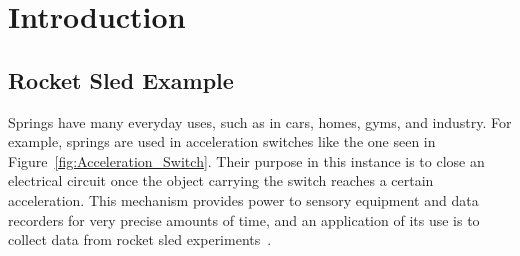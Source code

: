 \documentclass[10pt]{article}
\begin{document}
\section{Introduction}
\label{sec:Introduction}

\subsection{Rocket Sled Example}
\label{subsec:Example}

Springs have many everyday uses, such as in cars, homes, gyms, and industry. For example, springs are used in acceleration switches like the one seen in Figure~\ref{fig:Acceleration_Switch}. Their purpose in this instance is to close an electrical circuit once the object carrying the switch reaches a certain acceleration. This mechanism provides power to sensory equipment and data recorders for very precise amounts of time, and an application of its use is to collect data from rocket sled experiments~\cite{Massad2015}. 
\end{document}

